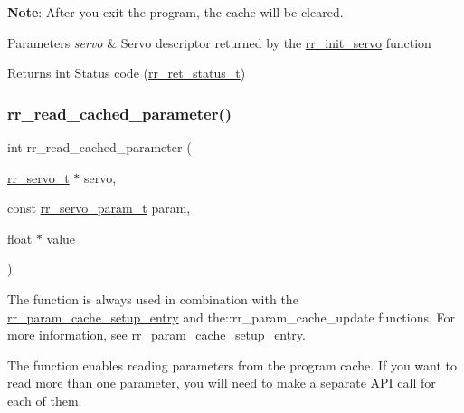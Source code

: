 {\bfseries Note}\+: After you exit the program, the cache will be cleared.


\begin{DoxyParams}{Parameters}
{\em servo} & Servo descriptor returned by the \hyperlink{group___common_ga0adb313a3eeb8a4399431e940a1f3e9e}{rr\+\_\+init\+\_\+servo} function \\
\hline
\end{DoxyParams}
\begin{DoxyReturn}{Returns}
int Status code (\hyperlink{api_8h_a92d5be5038abcf89837faf85a08debdc}{rr\+\_\+ret\+\_\+status\+\_\+t}) 
\end{DoxyReturn}
\mbox{\label{group___servo__info_ga9249202a29031f84b7dc3da37db05dfc}} 
\subsubsection{\texorpdfstring{rr\+\_\+read\+\_\+cached\+\_\+parameter()}{rr\_read\_cached\_parameter()}}
{\footnotesize\ttfamily int rr\+\_\+read\+\_\+cached\+\_\+parameter (\begin{DoxyParamCaption}\item[{\hyperlink{structrr__servo__t}{rr\+\_\+servo\+\_\+t} $\ast$}]{servo,  }\item[{const \hyperlink{api_8h_aa1f58887fab4642cf49f6f453c1d276d}{rr\+\_\+servo\+\_\+param\+\_\+t}}]{param,  }\item[{float $\ast$}]{value }\end{DoxyParamCaption})}



The function is always used in combination with the \hyperlink{group___servo__info_ga770c1e8b4d868cea649592e26a2706dd}{rr\+\_\+param\+\_\+cache\+\_\+setup\+\_\+entry} and the\+::rr\+\_\+param\+\_\+cache\+\_\+update functions. For more information, see \hyperlink{group___servo__info_ga770c1e8b4d868cea649592e26a2706dd}{rr\+\_\+param\+\_\+cache\+\_\+setup\+\_\+entry}. 

The function enables reading parameters from the program cache. If you want to read more than one parameter, you will need to make a separate A\+PI call for each of them.


